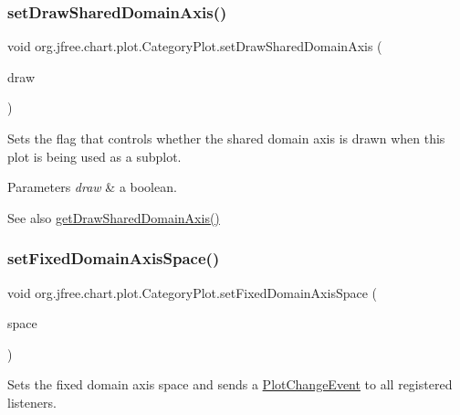 \subsubsection{\texorpdfstring{set\+Draw\+Shared\+Domain\+Axis()}{setDrawSharedDomainAxis()}}
{\footnotesize\ttfamily void org.\+jfree.\+chart.\+plot.\+Category\+Plot.\+set\+Draw\+Shared\+Domain\+Axis (\begin{DoxyParamCaption}\item[{boolean}]{draw }\end{DoxyParamCaption})}

Sets the flag that controls whether the shared domain axis is drawn when this plot is being used as a subplot.


\begin{DoxyParams}{Parameters}
{\em draw} & a boolean.\\
\hline
\end{DoxyParams}
\begin{DoxySeeAlso}{See also}
\mbox{\hyperlink{classorg_1_1jfree_1_1chart_1_1plot_1_1_category_plot_a9e0c506ed8f06c4136707ed8bc7febf2}{get\+Draw\+Shared\+Domain\+Axis()}} 
\end{DoxySeeAlso}
\mbox{\label{classorg_1_1jfree_1_1chart_1_1plot_1_1_category_plot_aefb6291a621dc2a80b97ae40ae020cf9}} 
\subsubsection{\texorpdfstring{set\+Fixed\+Domain\+Axis\+Space()}{setFixedDomainAxisSpace()}\hspace{0.1cm}{\footnotesize\ttfamily [1/2]}}
{\footnotesize\ttfamily void org.\+jfree.\+chart.\+plot.\+Category\+Plot.\+set\+Fixed\+Domain\+Axis\+Space (\begin{DoxyParamCaption}\item[{\mbox{\hyperlink{classorg_1_1jfree_1_1chart_1_1axis_1_1_axis_space}{Axis\+Space}}}]{space }\end{DoxyParamCaption})}

Sets the fixed domain axis space and sends a \mbox{\hyperlink{}{Plot\+Change\+Event}} to all registered listeners.


